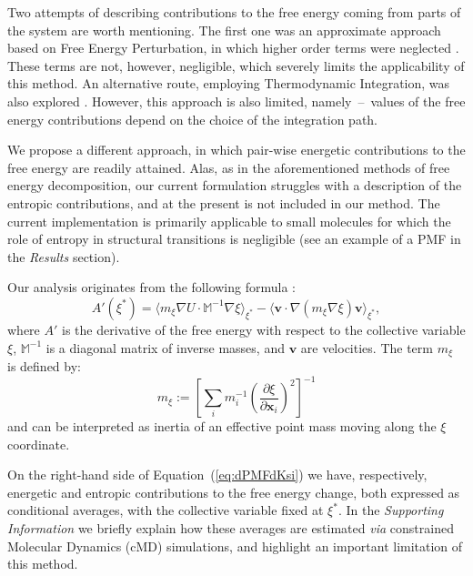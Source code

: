 Two attempts {\color{black}of describing contributions to the free energy coming from parts of the system} are worth mentioning.
The first one was an approximate approach based on Free Energy Perturbation, in which higher order terms were neglected \cite{brady1995decomposition}.
These terms are not, however, negligible, which severely limits the applicability of this method.
An alternative route, employing Thermodynamic Integration, was also explored \cite{boresch1995meaning}. 
However, this approach is also limited, namely~--~values of the free energy contributions depend on the choice of the integration path.

{\color{black}
We propose a different approach, in which pair-wise energetic contributions to the free energy are readily attained.
Alas, as in the aforementioned methods of free energy decomposition, our current formulation struggles with a description of the entropic contributions, and at the present is not included in our method.
The current implementation is primarily applicable to small molecules for which the role of entropy in structural transitions is negligible (see an example of a PMF in the \emph{Results} section).
}

Our analysis originates from the following formula \cite{carter1989constrained}:
\begin{equation}
\label{eq:dPMFdKsi}
A'(\xi^*)  =  \langle m_\xi \nabla U\cdot \mathbb{M}^{-1}\nabla\xi\rangle_{\xi^*}  - \langle \mathbf{v}\cdot\nabla(m_\xi\nabla\xi)\mathbf{v} \rangle_{\xi^*},
\end{equation}
where $A'$ is the derivative of the free energy with respect to the collective variable $\xi$, $\mathbb{M}^{-1}$ is a diagonal matrix of inverse masses, and $\mathbf{v}$ are velocities.
The term $m_\xi$ is defined by:
\begin{equation}
m_\xi := \left[ \sum_i m_i^{-1} \left(\frac{\partial\xi}{\partial\mathbf{x}_i}\right)^{2} \right]^{-1} 
\end{equation}
and can be interpreted as inertia of an effective point mass moving along the $\xi$ coordinate.

On the right-hand side of Equation~(\ref{eq:dPMFdKsi}) we have, respectively, energetic and entropic contributions to the free energy change, both expressed as conditional averages, with the collective variable fixed at $\xi^*$.
In the \emph{Supporting Information} we briefly explain how these averages are estimated \emph{via} constrained Molecular Dynamics (cMD) simulations, and highlight an important limitation of this method.

